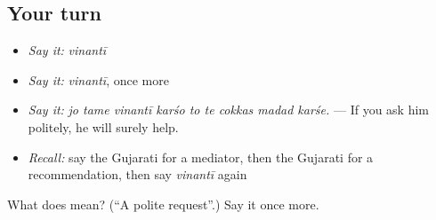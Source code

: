 \subsection*{Your turn}
\begin{itemize}
\raggedright
  \item \emph{Say it:} \emph{vinantī}
  \item \emph{Say it:} \emph{vinantī}, once more
  \item \emph{Say it:} \emph{jo tame vinantī karśo to te cokkas madad karśe.} — If you ask him politely, he will surely help.
  \item \emph{Recall:} say the Gujarati for a mediator, then the Gujarati for a recommendation, then say \emph{vinantī} again
\end{itemize}

\begin{tcolorbox}[breakable,colback=teal!4,colframe=teal!35!black,title={Before you move on}]
What does  mean? (\textquotedblleft{}A polite request\textquotedblright{}.) Say it once more.
\end{tcolorbox}
